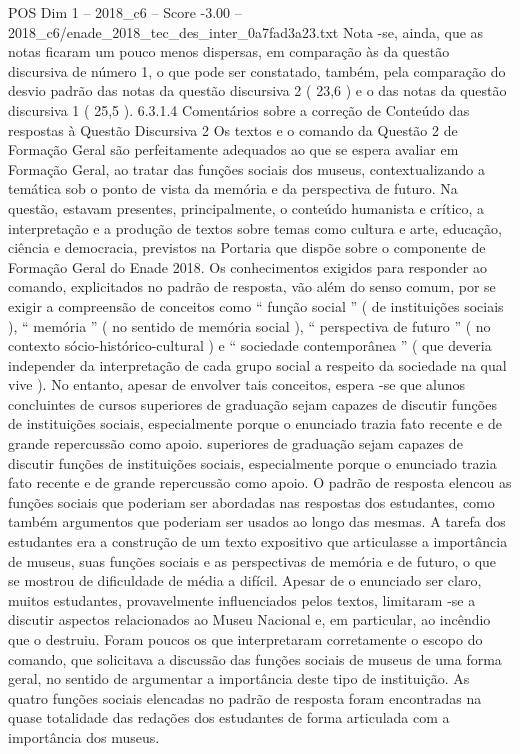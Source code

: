 \begin{textsample}{POS Dim 1 – 2018\_c6 – Score -3.00 – 2018\_c6/enade\_2018\_tec\_des\_inter\_0a7fad3a23.txt}
Nota -se, ainda, que as notas ficaram um pouco menos dispersas, em comparação às da questão discursiva de número 1, o que pode ser constatado, também, pela comparação do desvio padrão das notas da questão discursiva 2 ( 23,6 ) e o das notas da questão discursiva 1 ( 25,5 ). 6.3.1.4 Comentários sobre a correção de Conteúdo das respostas à Questão Discursiva 2 Os textos e o comando da Questão 2 de Formação Geral são perfeitamente adequados ao que se espera avaliar em Formação Geral, ao tratar das funções sociais dos museus, contextualizando a temática sob o ponto de vista da memória e da perspectiva de futuro.
Na questão, estavam presentes, principalmente, o conteúdo humanista e crítico, a interpretação e a produção de textos sobre temas como cultura e arte, educação, ciência e democracia, previstos na Portaria que dispõe sobre o componente de Formação Geral do Enade 2018.
Os conhecimentos exigidos para responder ao comando, explicitados no padrão de resposta, vão além do senso comum, por se exigir a compreensão de conceitos como “ função social ” ( de instituições sociais ), “ memória ” ( no sentido de memória social ), “ perspectiva de futuro ” ( no contexto sócio-histórico-cultural ) e “ sociedade contemporânea ” ( que deveria independer da interpretação de cada grupo social a respeito da sociedade na qual vive ).
No entanto, apesar de envolver tais conceitos, espera -se que alunos concluintes de cursos superiores de graduação sejam capazes de discutir funções de instituições sociais, especialmente porque o enunciado trazia fato recente e de grande repercussão como apoio. superiores de graduação sejam capazes de discutir funções de instituições sociais, especialmente porque o enunciado trazia fato recente e de grande repercussão como apoio.
O padrão de resposta elencou as funções sociais que poderiam ser abordadas nas respostas dos estudantes, como também argumentos que poderiam ser usados ao longo das mesmas.
A tarefa dos estudantes era a construção de um texto expositivo que articulasse a importância de museus, suas funções sociais e as perspectivas de memória e de futuro, o que se mostrou de dificuldade de média a difícil.
Apesar de o enunciado ser claro, muitos estudantes, provavelmente influenciados pelos textos, limitaram -se a discutir aspectos relacionados ao Museu Nacional e, em particular, ao incêndio que o destruiu.
Foram poucos os que interpretaram corretamente o escopo do comando, que solicitava a discussão das funções sociais de museus de uma forma geral, no sentido de argumentar a importância deste tipo de instituição.
As quatro funções sociais elencadas no padrão de resposta foram encontradas na quase totalidade das redações dos estudantes de forma articulada com a importância dos museus.

\end{textsample}
